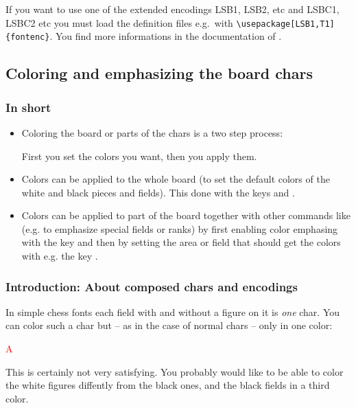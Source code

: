 \documentclass[pagesize,parskip=half-,fontsize=12pt]{scrartcl}
\begin{document}
If you want to use one of the extended encodings LSB1, LSB2, etc and
LSBC1, LSBC2 etc you must load the definition files e.g.\ with
\lstinline+\usepackage[LSB1,T1]{fontenc}+. You find more
informations in the documentation of \chessfss.




\subsection{Coloring and emphasizing the board chars}
\subsubsection{In short}

\begin{itemize}

\item Coloring the board or parts of the chars is a two step process:

First you set the colors you want, then you apply them.

\item
Colors can be applied to the whole board (to set the default colors
of the white and black pieces and fields). This done with the keys
 and .

\item Colors can be applied to part of the board together with other commands like 
 (e.g. to emphasize special fields or ranks)
by first enabling color emphasing with the key  and
then by setting the area or field that should get the colors with
e.g. the key .


\end{itemize}



\subsubsection{Introduction: About composed chars and encodings}
In simple chess fonts each field with and without a figure on it is
\emph{one} char. You can color such a char but -- as in the case of normal chars -- only
in one color:

\textcolor{red}{\Large A \BlackKingOnBlack}

This is certainly not very satisfying. You probably would like to be
able to color the white figures diffently from the black ones, and
the black fields in a third color.
\end{document}
